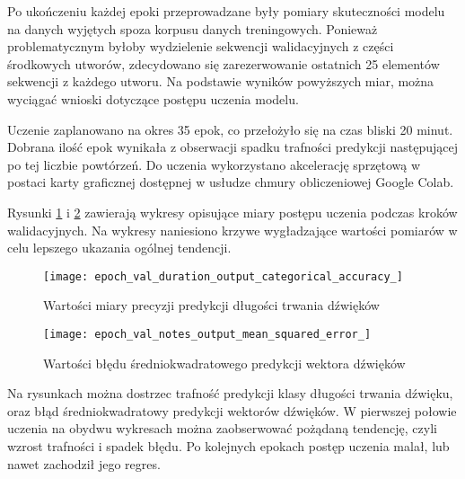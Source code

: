 {{        Po ukończeniu każdej epoki przeprowadzane były pomiary skuteczności modelu na danych wyjętych spoza korpusu 
        danych treningowych. Ponieważ problematycznym byłoby wydzielenie sekwencji walidacyjnych z\,\,części środkowych
        utworów, zdecydowano się zarezerwowanie ostatnich 25 elementów sekwencji z\,\,każdego utworu.
        Na podstawie wyników powyższych miar, można wyciągać wnioski dotyczące postępu uczenia modelu.

        Uczenie zaplanowano na okres 35 epok, co przełożyło się na czas bliski 20 minut. Dobrana ilość epok wynikała 
        z\,\,obserwacji spadku trafności predykcji następującej po tej liczbie powtórzeń. Do uczenia wykorzystano
        akcelerację sprzętową w\,\,postaci karty graficznej dostępnej w\,\,usłudze chmury obliczeniowej Google Colab.

        Rysunki \ref{epoch_val_duration_output_categorical_accuracy_} i\,\,\ref{epoch_val_notes_output_mean_squared_error_} zawierają wykresy opisujące miary postępu uczenia podczas kroków walidacyjnych. Na wykresy naniesiono krzywe wygładzające wartości pomiarów w celu lepszego ukazania ogólnej tendencji.

        \begin{figure}[H]
            \centering
            \texttt{[image: epoch\_val\_duration\_output\_categorical\_accuracy\_]}
            \caption{Wartości miary precyzji predykcji długości trwania dźwięków}
            \label{epoch_val_duration_output_categorical_accuracy_}
        \end{figure}

        \begin{figure}[H]
            \centering
            \texttt{[image: epoch\_val\_notes\_output\_mean\_squared\_error\_]}
            \caption{Wartości błędu średniokwadratowego predykcji wektora dźwięków}
            \label{epoch_val_notes_output_mean_squared_error_}
        \end{figure}

        Na rysunkach można dostrzec trafność predykcji klasy długości trwania dźwięku, oraz błąd średniokwadratowy
        predykcji wektorów dźwięków. W\,\,pierwszej połowie uczenia na obydwu wykresach można zaobserwować pożądaną tendencję,
        czyli wzrost trafności i\,\,spadek błędu. Po kolejnych epokach postęp uczenia malał, lub nawet zachodził jego regres.
    }
}